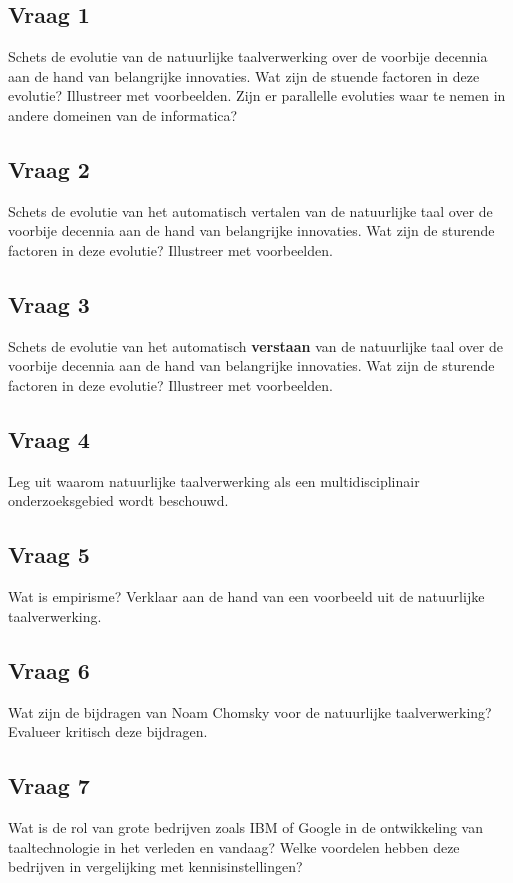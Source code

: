 \documentclass[../main.tex]{subfiles}
\begin{document}
\subsection{Vraag 1}
\begin{question}
Schets de evolutie van de natuurlijke taalverwerking over de voorbije decennia aan de hand van belangrijke innovaties. Wat zijn de stuende factoren in deze evolutie? Illustreer met voorbeelden.
Zijn er parallelle evoluties waar te nemen in andere domeinen van de informatica?
\end{question}

\subsection{Vraag 2}
\begin{question}
Schets de evolutie van het automatisch vertalen van de natuurlijke taal over de voorbije decennia aan de hand van belangrijke innovaties. Wat zijn de sturende factoren in deze evolutie? Illustreer met voorbeelden.
\end{question}

\subsection{Vraag 3}
\begin{question}
Schets de evolutie van het automatisch \textbf{verstaan} van de natuurlijke taal over de voorbije decennia aan de hand van belangrijke innovaties. Wat zijn de sturende factoren in deze evolutie? Illustreer met voorbeelden.
\end{question}

\subsection{Vraag 4}
\begin{question}
Leg uit waarom natuurlijke taalverwerking als een multidisciplinair onderzoeksgebied wordt beschouwd.
\end{question}

\subsection{Vraag 5}
\begin{question}
Wat is empirisme? Verklaar aan de hand van een voorbeeld uit de natuurlijke taalverwerking.
\end{question}

\subsection{Vraag 6}
\begin{question}
Wat zijn de bijdragen van Noam Chomsky voor de natuurlijke taalverwerking? Evalueer kritisch deze bijdragen.
\end{question}

\subsection{Vraag 7}
\begin{question}
Wat is de rol van grote bedrijven zoals IBM of Google in de ontwikkeling van taaltechnologie in het verleden en vandaag? Welke voordelen hebben deze bedrijven in vergelijking met kennisinstellingen?
\end{question}
\end{document}
